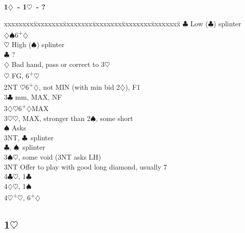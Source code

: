 \documentclass[10pt]{article}
\renewcommand{\c}{$\clubsuit$}
\renewcommand{\d}{$\diamondsuit$}
\newcommand{\h}{$\heartsuit$}
\newcommand{\s}{$\spadesuit$}
\newcommand{\p}{\textsuperscript{+}}
\newcommand{\m}{\textsuperscript{\textminus}}
\newcommand{\x}{DBL}
\newenvironment{bidtable}[1][]
{\textbf{#1}
  \begin{adjustwidth}{1em}{}
    \addvspace{2pt}
    \begin{tabbing}
      xxxxxxxx\=xxxxxxxx\=xxxxxxxx\=xxxxxxxx\=xxxxxxxx\=xxxxxxxx\=\kill}
{\end{tabbing}\end{adjustwidth}\bigskip}%
\newcommand{\pdfh}{\texorpdfstring{\h{}}{H}}
\begin{document}
\begin{multicols*}{2}
\begin{bidtable}[1\d\ - 1\h\ - ?]
                \>      \c      \> Low (\c) splinter           \\
                \>      \d      {}\s 6\p\d                   \\
                \>      \h      \> High (\s) splinter          \\
                \c  \> ?                                       \\
                \d  \> Bad hand, pass or correct to 3\h        \\
                \h  \> FG, 6\p\h                               \\
2NT             \h 6\p\d, not MIN (with min bid 2\d), F1       \\
3\c             {} mm, MAX, NF                                  \\
3\d             {}\m\h 6\p\d MAX                                 \\
3\h             {}\h, MAX, stronger than 2\s, some short         \\
                \s  \> Asks                                    \\
                \>      \> 3NT, \c\ splinter                       \\
                \>      \c, \s\ splinter                       \\
3\s             {}\h, some void (3NT asks LH)                    \\
3NT             \> Offer to play with good long diamond, usually 7 \\
4\c             {}\h, 1\c                                        \\
4\d             {}\h, 1\s                                        \\
4\h             {}\p\h, 6\p\d                                    \\
\end{bidtable}

\newpage
\subsection{1\pdfh}


\end{multicols*}
\end{document}
